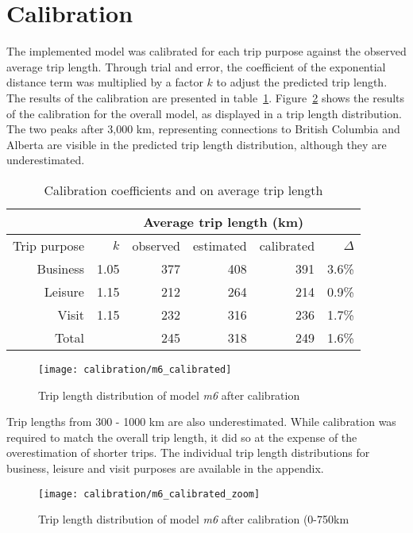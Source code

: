 \section{Calibration}

The implemented model was calibrated for each trip purpose against the observed average trip length. Through trial and error, the coefficient of the exponential distance term was multiplied by a factor $k$ to adjust the predicted trip length. The results of the calibration are presented in table~\ref{table:calibration}. Figure~\ref{fig:overall-calibration} shows the results of the calibration for the overall model, as displayed in a trip length distribution. The two peaks after 3,000 km, representing connections to British Columbia and Alberta are visible in the predicted trip length distribution, although they are underestimated. 

\begin{table}[H]
\centering
\caption{Calibration coefficients and on average trip length}
\label{table:calibration}
\begin{tabular}{@{}rrrrrr@{}}
  \toprule
 &  & \multicolumn{3}{c}{Average trip length (km)} \\ \midrule
 Trip purpose & $k$ & observed & estimated & calibrated & $\Delta$ \\ \midrule
  Business & 1.05 & 377 & 408 & 391 & 3.6\% \\ 
  Leisure & 1.15 & 212 & 264 & 214  & 0.9\% \\
  Visit  & 1.15  & 232 & 316 & 236  & 1.7\%\\   \midrule
  Total  &  & 245 & 318 & 249 & 1.6\% \\ 
   \bottomrule
\end{tabular}
\end{table}

\begin{figure}[H]
\centering
\texttt{[image: calibration/m6\_calibrated]}
\caption{Trip length distribution of model \textit{m6} after calibration}
\label{fig:overall-calibration}
\end{figure}

Trip lengths from 300 - 1000 km are also underestimated. While calibration was required to match the overall trip length, it did so at the expense of the overestimation of shorter trips. The individual trip length distributions for business, leisure and visit purposes are available in the appendix. 

\begin{figure}[H]
\centering
\texttt{[image: calibration/m6\_calibrated\_zoom]}
\caption{Trip length distribution of model \textit{m6} after calibration (0-750km}
\label{fig:overall-calibration}
\end{figure}

